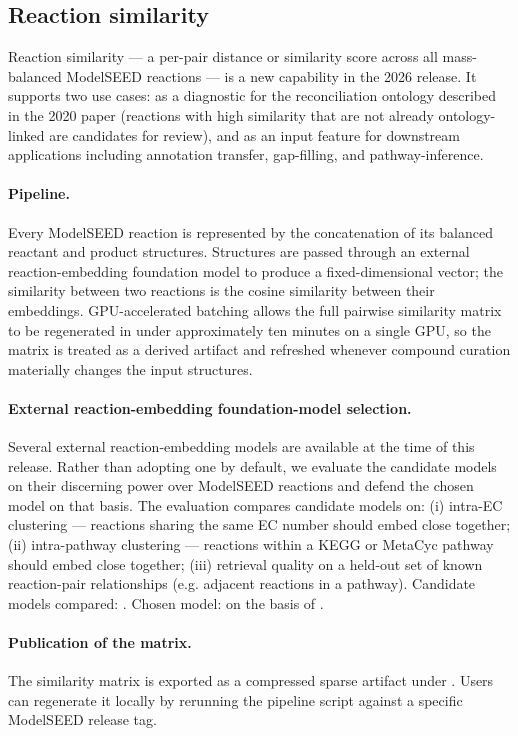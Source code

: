 \subsection{Reaction similarity}\label{sec:methods-similarity}

Reaction similarity --- a per-pair distance or similarity score across all
mass-balanced ModelSEED reactions --- is a new capability in the 2026 release.
It supports two use cases: as a diagnostic for the reconciliation ontology
described in the 2020 paper (reactions with high similarity that are not already
ontology-linked are candidates for review), and as an input feature for
downstream applications including annotation transfer, gap-filling, and
pathway-inference.

\paragraph{Pipeline.} Every ModelSEED reaction is represented by the
concatenation of its balanced reactant and product structures. Structures are
passed through an external reaction-embedding foundation model to produce a
fixed-dimensional vector; the similarity between two reactions is the cosine
similarity between their embeddings. GPU-accelerated batching allows the full
pairwise similarity matrix to be regenerated in under approximately ten minutes
on a single GPU, so the matrix is treated as a derived artifact and refreshed
whenever compound curation materially changes the input structures.

\paragraph{External reaction-embedding foundation-model selection.} Several
external reaction-embedding models are available at the time of this release.
Rather than adopting one by default, we evaluate the candidate models on their
discerning power over ModelSEED reactions and defend the chosen model on that
basis. The evaluation compares candidate models on: (i) intra-EC clustering ---
reactions sharing the same EC number should embed close together; (ii)
intra-pathway clustering --- reactions within a KEGG or MetaCyc pathway should
embed close together; (iii) retrieval quality on a held-out set of known
reaction-pair relationships (e.g. adjacent reactions in a pathway). Candidate
models compared: \TBD[list]. Chosen model: \TBD{} on the basis of
.

\paragraph{Publication of the matrix.} The similarity matrix is exported as a
compressed sparse artifact under . Users
can regenerate it locally by rerunning the pipeline script against a specific
ModelSEED release tag.
